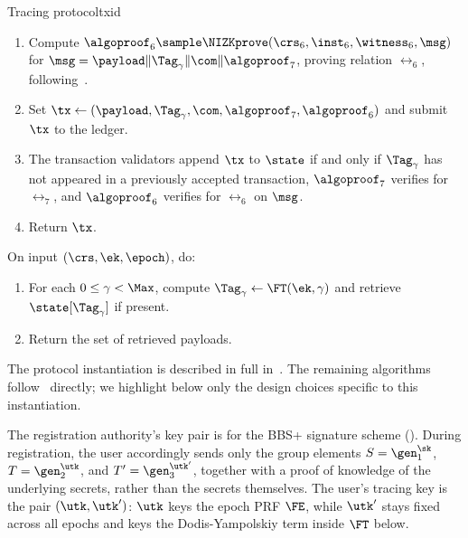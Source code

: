 \begin{protocolbox}{Tracing protocol}{txid}
\begin{description}
\begin{enumerate}
        \item Compute $\algoproof_6 \sample
          \NIZKprove(\crs_6,\inst_6,\witness_6,\msg)$ for $\msg =
          \payload\|\Tag_\gamma\|\com\|\algoproof_7$, proving relation
          $\rel_6$, following~.

        \item Set $\tx \leftarrow
          (\payload,\Tag_\gamma,\com,\algoproof_7,\algoproof_6)$ and submit
          $\tx$ to the ledger.

        \item The transaction validators append $\tx$ to $\state$ if and only
          if $\Tag_\gamma$ has not appeared in a previously accepted
          transaction, $\algoproof_7$ verifies for $\rel_7$, and $\algoproof_6$
          verifies for $\rel_6$ on $\msg$.

        \item Return $\tx$.

      \end{enumerate}

    \item[$\{\payload\} \leftarrow \IDidentify(\crs,\ek,\epoch)$ :] On input
      $(\crs,\ek,\epoch)$, do:

      \begin{enumerate}

        \item For each $0 \leq \gamma < \Max$, compute $\Tag_\gamma \leftarrow
          \FT(\ek,\gamma)$ and retrieve $\state[\Tag_\gamma]$ if present.

        \item Return the set of retrieved payloads.

      \end{enumerate}

  \end{description}

\end{protocolbox}

The protocol instantiation is described in full in~. The
remaining algorithms follow~ directly; we highlight
below only the design choices specific to this instantiation.

The registration authority's key pair is for the BBS+ signature scheme
(). During registration, the user accordingly sends only the
group elements $S = \gen_1^{\sk}$, $T = \gen_2^{\utk}$, and $T' =
\gen_3^{\utk'}$, together with a proof of knowledge of the underlying secrets,
rather than the secrets themselves. The user's tracing key is the pair
$(\utk,\utk')$: $\utk$ keys the epoch PRF $\FE$, while $\utk'$ stays fixed
across all epochs and keys the Dodis-Yampolskiy term inside $\FT$ below.

